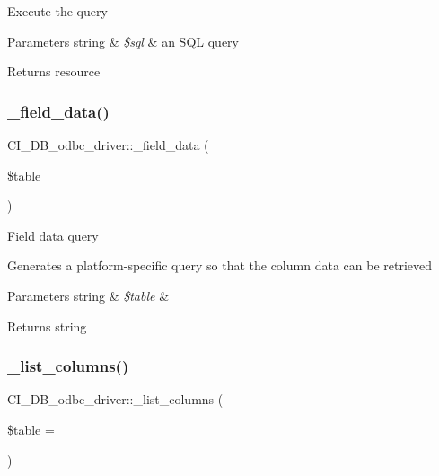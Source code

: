 Execute the query


\begin{DoxyParams}[1]{Parameters}
string & {\em \$sql} & an S\+QL query \\
\hline
\end{DoxyParams}
\begin{DoxyReturn}{Returns}
resource 
\end{DoxyReturn}
\mbox{\label{class_c_i___d_b__odbc__driver_a11cf239b1f5eec67182813400bc3fcc1}} 
\subsubsection{\texorpdfstring{\+\_\+field\+\_\+data()}{\_field\_data()}}
{\footnotesize\ttfamily C\+I\+\_\+\+D\+B\+\_\+odbc\+\_\+driver\+::\+\_\+field\+\_\+data (\begin{DoxyParamCaption}\item[{}]{\$table }\end{DoxyParamCaption})\hspace{0.3cm}{\ttfamily [protected]}}

Field data query

Generates a platform-\/specific query so that the column data can be retrieved


\begin{DoxyParams}[1]{Parameters}
string & {\em \$table} & \\
\hline
\end{DoxyParams}
\begin{DoxyReturn}{Returns}
string 
\end{DoxyReturn}
\mbox{\label{class_c_i___d_b__odbc__driver_aaad9fcfe553decb249097b9c2e06401a}} 
\subsubsection{\texorpdfstring{\+\_\+list\+\_\+columns()}{\_list\_columns()}}
{\footnotesize\ttfamily C\+I\+\_\+\+D\+B\+\_\+odbc\+\_\+driver\+::\+\_\+list\+\_\+columns (\begin{DoxyParamCaption}\item[{}]{\$table = {\ttfamily \textquotesingle{}\textquotesingle{}} }\end{DoxyParamCaption})\hspace{0.3cm}{\ttfamily [protected]}}

